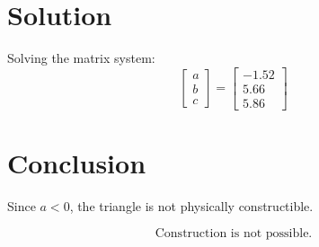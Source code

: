 \documentclass[journal]{IEEEtran}
\begin{document}
\section*{\large\textbf{Solution}}
\vspace{0.5cm}

Solving the matrix system:
\[
\begin{bmatrix}
a \\
b \\
c
\end{bmatrix}
=
\begin{bmatrix}
-1.52 \\
5.66 \\
5.86
\end{bmatrix}
\]

\section*{\large\textbf{Conclusion}}
\vspace{0.5cm}

Since \( a < 0 \), the triangle is not physically constructible.

\[
\text{Construction is not possible.}
\]
\end{document}

